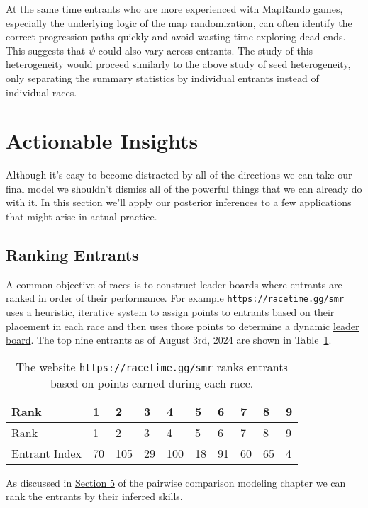 \documentclass[
  letterpaper,
  DIV=11,
  numbers=noendperiod]{scrartcl}
\begin{document}
At the same time entrants who are more experienced with MapRando games,
especially the underlying logic of the map randomization, can often
identify the correct progression paths quickly and avoid wasting time
exploring dead ends. This suggests that \(\psi\) could also vary across
entrants. The study of this heterogeneity would proceed similarly to the
above study of seed heterogeneity, only separating the summary
statistics by individual entrants instead of individual races.

\section{Actionable Insights}\label{actionable-insights}

Although it's easy to become distracted by all of the directions we can
take our final model we shouldn't dismiss all of the powerful things
that we can already do with it. In this section we'll apply our
posterior inferences to a few applications that might arise in actual
practice.

\subsection{Ranking Entrants}\label{ranking-entrants}

A common objective of races is to construct leader boards where entrants
are ranked in order of their performance. For example
\texttt{https://racetime.gg/smr} uses a heuristic, iterative system to
assign points to entrants based on their placement in each race and then
uses those points to determine a dynamic
\href{https://racetime.gg/smr/leaderboards}{leader board}. The top nine
entrants as of August 3rd, 2024 are shown in
Table~\ref{tbl-leader-board}.

\begin{longtable}[]{@{}llllllllll@{}}
\caption{The website \texttt{https://racetime.gg/smr} ranks entrants
based on points earned during each
race.}\label{tbl-leader-board}\tabularnewline
\toprule\noalign{}
Rank & 1 & 2 & 3 & 4 & 5 & 6 & 7 & 8 & 9 \\
\midrule\noalign{}
\endfirsthead
\toprule\noalign{}
Rank & 1 & 2 & 3 & 4 & 5 & 6 & 7 & 8 & 9 \\
\midrule\noalign{}
\endhead
\bottomrule\noalign{}
\endlastfoot
Entrant Index & 70 & 105 & 29 & 100 & 18 & 91 & 60 & 65 & 4 \\
\end{longtable}

As discussed in
\href{https://betanalpha.github.io/assets/chapters_html/pairwise_comparison_modeling.html\#ranking-items}{Section
5} of the pairwise comparison modeling chapter we can rank the entrants
by their inferred skills.
\end{document}
